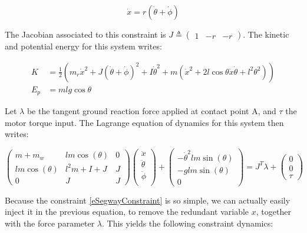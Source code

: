 \documentclass[a4paper,11pt]{article}
\begin{document}
\begin{equation}
	\dot{x} = r (\dot{\theta} + \dot{\phi})
	\label{eSegwayConstraint}
\end{equation}

The Jacobian associated to this constraint is $J \triangleq \begin{pmatrix} 1 & -r & -r\end{pmatrix}$. The kinetic and potential energy for this system writes:

\begin{equation}
\begin{aligned}
K &= \frac{1}{2} \left(m_r \dot{x}^2 + J (\dot{\theta} + \dot{\phi})^2 + I \dot{\theta}^2 + m (\dot{x}^2 + 2 l \cos \theta \dot{x} \dot{\theta} + l^2 \theta^2)\right) \\ 
E_p &= m l g \cos \theta
\end{aligned}
\end{equation}

Let $\lambda$ be the tangent ground reaction force applied at contact point A, and $\tau$ the motor torque input. The Lagrange equation of dynamics for this system then writes:

\begin{equation}
\begin{pmatrix}
m + {m_w} & l m \cos\left({\theta}\right) & 0 \\
l m \cos\left({\theta}\right) & l^{2} m + I + J & J \\
0 & J & J
\end{pmatrix}
\begin{pmatrix}
\ddot{x} \\
\ddot{\theta} \\
\ddot{\phi} \\
\end{pmatrix}
+
\begin{pmatrix}
-{\dot{\theta}}^{2} l m \sin\left({\theta}\right) \\
-g l m \sin\left({\theta}\right) \\
0
\end{pmatrix} = J^T \lambda + \begin{pmatrix} 0 \\ 0 \\ \tau \end{pmatrix}
\end{equation}

Because the constraint \eqref{eSegwayConstraint} is so simple, we can actually easily inject it in the previous equation, to remove the redundant variable $x$, together with the force parameter $\lambda$. This yields the following constraint dynamics:
\end{document}
